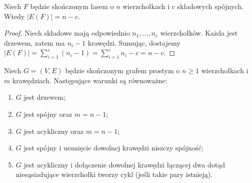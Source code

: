 \begin{wniosek}
Niech $F$ będzie skończonym lasem o $n$ wierzchołkach
i $c$ składowych spójnych. Wtedy $|E(F)|=n-c$.
\end{wniosek}

\begin{proof}
Niech składowe mają odpowiednio $n_1,\ldots,n_c$
wierzchołków. Każda jest drzewem, zatem ma
$n_i-1$ krawędzi. Sumując, dostajemy
$|E(F)|=\sum_{i=1}^{c}(n_i-1)
=\sum_{i=1}^{c}n_i-c=n-c$.
\end{proof}

\begin{twierdzenie}
Niech $G=(V,E)$ będzie skończonym grafem prostym
o $n\ge1$ wierzchołkach i $m$ krawędziach.
Następujące warunki są równoważne:
\begin{enumerate}[label=(\roman*)]
\item $G$ jest drzewem;
\item $G$ jest spójny oraz $m=n-1$;
\item $G$ jest acykliczny oraz $m=n-1$;
\item $G$ jest spójny i usunięcie dowolnej
krawędzi niszczy spójność;
\item $G$ jest acykliczny i dołączenie dowolnej
krawędzi łączącej dwa dotąd niesąsiadujące
wierzchołki tworzy cykl (jeśli takie pary istnieją).
\end{enumerate}
\end{twierdzenie}

